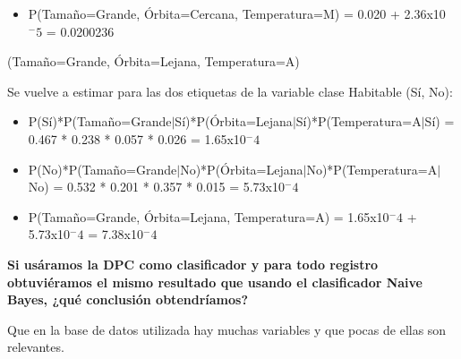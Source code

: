 \documentclass[11pt]{exam}
\begin{document}
\begin{questions}
{\begin{enumerate}
\begin{itemize}
		\item P(Tamaño=Grande, Órbita=Cercana, Temperatura=M) = 0.020 + 2.36x10$^-5$ = 0.0200236
		
	\end{itemize}
	
	{\bf \item (Tamaño=Grande, Órbita=Lejana, Temperatura=A)}
	
	Se vuelve a estimar para las dos etiquetas de la variable clase Habitable (Sí, No): 
	
	\begin{itemize}
		\item P(Sí)*P(Tamaño=Grande$|$Sí)*P(Órbita=Lejana$|$Sí)*P(Temperatura=A$|$Sí) = 0.467 * 0.238 * 0.057 * 0.026 = 1.65x10$^-4$ 
		
		\item P(No)*P(Tamaño=Grande$|$No)*P(Órbita=Lejana$|$No)*P(Temperatura=A$|$No) = 0.532 * 0.201 * 0.357 * 0.015 = 5.73x10$^-4$
		
		\item P(Tamaño=Grande, Órbita=Lejana, Temperatura=A) = 1.65x10$^-4$ + 5.73x10$^-4$ = 7.38x10$^-4$
	\end{itemize}
\end{enumerate}
}

{\bf \question Si usáramos la DPC como clasificador y para todo registro obtuviéramos el mismo resultado que usando el clasificador Naive Bayes, ¿qué conclusión obtendríamos?}

Que en la base de datos utilizada hay muchas variables y que pocas de ellas son relevantes.

\end{questions}
\end{document}
